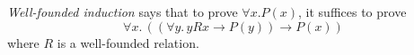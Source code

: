 \documentclass{amsart}
\begin{document}
\emph{Well-founded induction} says that to prove $\forall x.P(x)$, it suffices to prove
\[
  \forall x.\,((\forall y.\,y R x \to P(y)) \to P(x))
\]
where $R$ is a well-founded relation.
\begin{code}%
%
\>[2]\AgdaSpace{}%
\AgdaSymbol{:}%
\>[68I]\AgdaSymbol{\{}\AgdaSpace{}%
\AgdaSymbol{:}\AgdaSpace{}%
\AgdaSymbol{\}}\AgdaSpace{}%
\<%
\\
\>[.][@{}l@{}]\<[68I]%
\>[17]\AgdaSymbol{\{}\AgdaSpace{}%
\AgdaSymbol{:}\AgdaSpace{}%
\AgdaSpace{}%
\AgdaSpace{}%
\AgdaSymbol{\}}\AgdaSpace{}%
\<%
\\
%
\>[17]\AgdaSymbol{(}\AgdaOperator{\AgdaBound{\AgdaUnderscore{}<\AgdaUnderscore{}}}\AgdaSpace{}%
\AgdaSymbol{:}\AgdaSpace{}%
\AgdaSpace{}%
\AgdaSpace{}%
\AgdaSpace{}%
\AgdaSpace{}%
\AgdaSymbol{)}\AgdaSpace{}%
\<%
\\
%
\>[17]\AgdaSpace{}%
\AgdaOperator{\AgdaBound{\AgdaUnderscore{}<\AgdaUnderscore{}}}\AgdaSpace{}%
\<%
\\
%
\>[17]\AgdaSymbol{((}\AgdaSpace{}%
\AgdaSymbol{:}\AgdaSpace{}%
\AgdaSymbol{)}\AgdaSpace{}%
\AgdaSpace{}%
\AgdaSymbol{((}\AgdaSpace{}%
\AgdaSymbol{:}\AgdaSpace{}%
\AgdaSymbol{)}\AgdaSpace{}%
\AgdaSpace{}%
\AgdaSpace{}%
\AgdaOperator{\AgdaBound{<}}\AgdaSpace{}%
\AgdaSpace{}%
\AgdaSpace{}%
\AgdaSpace{}%
\AgdaSymbol{)}\AgdaSpace{}%
\AgdaSpace{}%
\AgdaSpace{}%
\AgdaSymbol{)}\AgdaSpace{}%
\<%
\\
%
\>[17]\AgdaSymbol{(}\AgdaSpace{}%
\AgdaSymbol{:}\AgdaSpace{}%
\AgdaSymbol{)}\AgdaSpace{}%
\AgdaSpace{}%
\AgdaSpace{}%
\<%
\\
%
\>[2]\AgdaSpace{}%
\AgdaSymbol{\{}\AgdaSymbol{\}}\AgdaSpace{}%
\AgdaSymbol{\{}\AgdaSymbol{\}}%
\>[24]\AgdaOperator{\AgdaBound{\AgdaUnderscore{}<\AgdaUnderscore{}}}\AgdaSpace{}%
\AgdaSpace{}%
\AgdaSpace{}%
\AgdaSpace{}%
\AgdaSymbol{=}\AgdaSpace{}%
\AgdaSpace{}%
\AgdaSpace{}%
\AgdaSymbol{(}\AgdaSpace{}%
\AgdaSymbol{)}\AgdaSpace{}%

\end{code}
\end{document}
